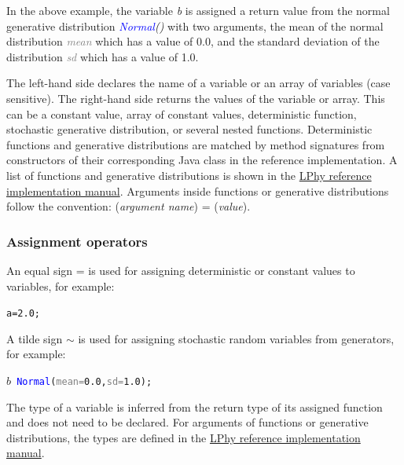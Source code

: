 \documentclass[10pt,letterpaper,table]{article}
\theoremstyle{definition}
\begin{document}
In the above example, the variable \textit{\textcolor{bluishgreen}{b}} is assigned a return value from the normal generative distribution \textit{\textcolor{blue}{Normal}()} with two arguments, the mean of the normal distribution \textit{\textcolor{gray}{mean}} which has a value of 0.0, and the standard deviation of the distribution \textit{\textcolor{gray}{sd}} which has a value of 1.0.

The left-hand side declares the name of a variable or an array of variables (case sensitive).
The right-hand side returns the values of the variable or array. This can be a constant value, array of constant values, deterministic function, stochastic generative distribution, or several nested functions.
Deterministic functions and generative distributions are matched by method signatures from constructors of their corresponding Java class in the reference implementation. 
A list of functions and generative distributions is shown in the \href{https://github.com/LinguaPhylo/linguaPhylo/blob/master/lphy/doc/index.md}{LPhy reference implementation manual}.
Arguments inside functions or generative distributions follow the convention: 
(\textit{argument name}) = (\textit{value}).

\subsubsection{Assignment operators}
An equal sign = is used for assigning deterministic or constant values to variables, for example: 
{
  \small
  \begin{listing}
    \begin{alltt}
    a = \textcolor{constant}{2.0};
    \end{alltt}
  \end{listing}
}
\noindent A tilde sign $\sim$ is used for assigning stochastic random variables from generators, for example:  
{
  \small
  \begin{listing}
    \begin{alltt}
    \textcolor{bluishgreen}{\(b\)} ~ \textcolor{blue}{Normal}(\textcolor{gray}{mean=}\textcolor{constant}{0.0}, \textcolor{gray}{sd=}\textcolor{constant}{1.0});
    \end{alltt}
  \end{listing}
}
\noindent The type of a variable is inferred from the return type of its assigned function and does not need to be declared. 
For arguments of functions or generative distributions, the types are defined in the  \href{https://github.com/LinguaPhylo/linguaPhylo/blob/master/lphy/doc/index.md}{LPhy reference implementation manual}. 
\end{document}
